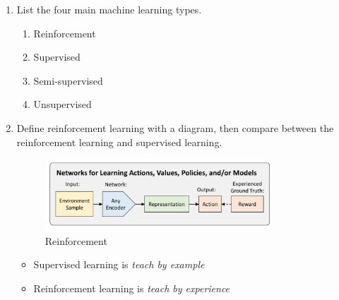 \documentclass[12pt]{article}
\newenvironment{QandA}{\begin{enumerate}[label=\bfseries\arabic*.]\bfseries}
{\end{enumerate}}
\newenvironment{answered}{\par\normalfont\color{Sepia}}{}
\begin{document}
\begin{QandA}
    \item List the four main machine learning types.
    \begin{answered}
        \begin{enumerate}
            \item Reinforcement
            \item Supervised
            \item Semi-supervised
            \item Unsupervised
        \end{enumerate}
    \end{answered}

    \item Define reinforcement learning with a diagram, then compare between the
          reinforcement learning and supervised learning.
    \begin{answered}
        \begin{figure}[H]
            \centering
            \includegraphics[width=0.8\textwidth]{reinforcement.png}
            \caption{Reinforcement}
            \label{fig:reinforcement}
        \end{figure}

        \begin{itemize}
            \item Supervised learning is \textit{teach by example}
            \item Reinforcement learning is \textit{teach by experience}
        \end{itemize}
        
    \end{answered}


\end{QandA}
\end{document}
